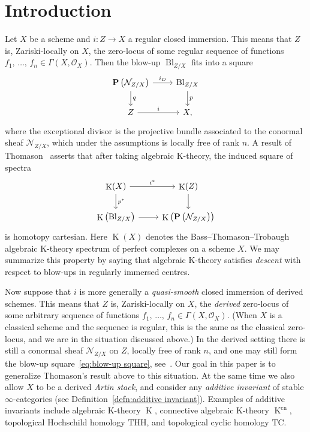 \documentclass[11pt]{article}
\theoremstyle{definition}
\numberwithin{equation}{section}
\numberwithin{figure}{section}
\numberwithin{table}{section}
\newcommand{\sN}{\ensuremath{\mathcal{N}}\xspace}
\newcommand{\sO}{\ensuremath{\mathcal{O}}\xspace}
\newcommand{\bP}{\ensuremath{\mathbf{P}}\xspace}
\renewcommand{\P}{\bP}
\DeclareMathOperator{\K}{K}
\DeclareMathOperator{\Bl}{Bl}
\newcommand{\mrm}[1]{\ensuremath{\mathrm{#1}}\xspace}
\begin{document}
\section{Introduction}\label{sec:intro}

Let $X$ be a scheme and $i : Z \to X$ a regular closed immersion. This means that $Z$ is, Zariski-locally on $X$, the zero-locus of some regular sequence of functions $f_1,\,\ldots,\,f_n \in \Gamma(X,\sO_X)$. Then the blow-up $\Bl_{Z/X}$ fits into a square
\begin{equation}\label{eq:blow-up square}
\begin{tikzcd}
\P\left(\sN_{Z/X}\right) \ar{r}{i_D}\ar{d}{q} & \Bl_{Z/X} \ar{d}{p}
\\
Z \ar{r}{i} & X,
\end{tikzcd}
\end{equation}
where the exceptional divisor is the projective bundle associated to the conormal sheaf $\sN_{Z/X}$, which under the assumptions is locally free of rank $n$. A result of Thomason~\cite{ThomasonBlowup} asserts that after taking algebraic K-theory, the induced square of spectra
\[
\begin{tikzcd}
\K(X) \ar{r}{i^*}\ar{d}{p^*} & \K(Z) \ar{d}
\\
\K\left(\Bl_{Z/X}\right) \ar{r} & \K\left(\P\left(\sN_{Z/X}\right)\right)
\end{tikzcd}
\]
is homotopy cartesian. Here $\K(X)$ denotes the Bass--Thomason--Trobaugh algebraic K-theory spectrum of perfect complexes on a scheme $X$. We may summarize this property by saying that algebraic K-theory satisfies \emph{descent} with respect to blow-ups in regularly immersed centres.

Now suppose that $i$ is more generally a \emph{quasi-smooth} closed immersion of derived schemes. This means that $Z$ is, Zariski-locally on $X$, the \emph{derived} zero-locus of some arbitrary sequence of functions $f_1,\,\ldots,\,f_n \in \Gamma(X,\sO_X)$. (When $X$ is a classical scheme and the sequence is regular, this is the same as the classical zero-locus, and we are in the situation discussed above.) In the derived setting there is still a conormal sheaf $\sN_{Z/X}$ on $Z$, locally free of rank $n$, and one may still form the blow-up square~\eqref{eq:blow-up square}, see~\cite{KhanBlowup}. Our goal in this paper is to generalize Thomason's result above to this situation. At the same time we also allow $X$ to be a derived \emph{Artin stack}, and consider any \emph{additive invariant} of stable $\infty$-categories (see
Definition~\ref{defn:additive invariant}). Examples of additive invariants include algebraic K-theory $\K$, connective algebraic K-theory $\K^\mrm{cn}$, topological Hochschild homology $\mrm{THH}$, and topological cyclic homology $\mrm{TC}$.
\end{document}
